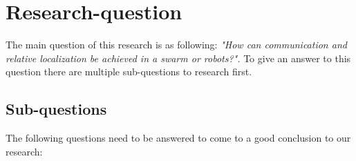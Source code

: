 \documentclass[10pt,a4paper]{article}
\begin{document}
\newpage
\section{Research-question}

The main question of this research is as following: \textit{"How can communication and relative localization be achieved in a swarm or robots?".} To give an answer to this question there are multiple sub-questions to research first. 
 


\subsection{Sub-questions} 
The following questions need to be answered to come to a good conclusion to our research:
\end{document}
